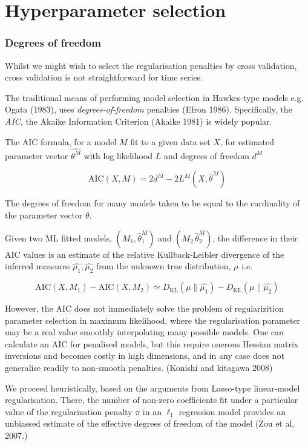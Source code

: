 \documentclass[11pt]{article}
\begin{document}
    \section{Hyperparameter selection}\label{hyperparameter-selection}

    \subsubsection{Degrees of freedom}\label{degrees-of-freedom}

Whilst we might wish to select the regularisation penalties by cross
validation, cross validation is not straightforward for time series.

The traditional means of performing model selection in Hawkes-type
models e.g. Ogata (1983), uses \emph{degrees-of-freedom} penalties
(Efron 1986). Specifically, the \emph{AIC}, the Akaike Information
Criterion (Akaike 1981) is widely popular.

The AIC formula, for a model $M$ fit to a given data set $X$, for
estimated parameter vector $\hat{\theta^M}$ with log likelihood $L$ and
degrees of freedom $d^M$

\[\mathrm{AIC}(X,M)=2d^M-2L^M(X,\hat{\theta}^M)\]

The degrees of freedom for many models taken to be equal to the
cardinality of the parameter vector $\theta$.

Given two ML fitted models, $(M_1,\hat{\theta}^M_1)$ and
$(M_2\,\hat{\theta}^M_2)$, the difference in their AIC values is an
estimate of the relative Kullback-Leibler divergence of the inferred
measures $\hat{\mu_1},\hat{\mu_2}$ from the unknown true distribution,
$\mu$ i.e.

\[\mathrm{AIC}(X,M_1)-\mathrm{AIC}(X,M_2) \simeq D_\mathrm{KL}(\mu\|\hat{\mu_1}) - D_\mathrm{KL}(\mu\|\hat{\mu_2})\]

However, the AIC does not immediately solve the problem of
regularizition parameter selection in maximum likelihood, where the
regularisation parameter may be a real value smoothly interpolating many
possible models. One can calculate an AIC for penalised models, but this
require onerous Hessian matrix inversions and becomes costly in high
dimensions, and in any case does not generalise readily to non-smooth
penalties. (Konishi and kitagawa 2008)

We proceed heuristically, based on the arguments from Lasso-type
linear-model regularisation. There, the number of non-zero coefficients
fit under a particular value of the regularization penalty $\pi$ in an
$\ell_1$ regression model provides an unbiassed estimate of the
effective degrees of freedom of the model (Zou et al, 2007.)
\end{document}

